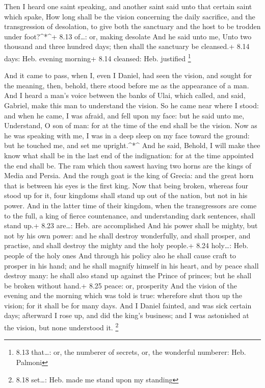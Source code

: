  Then I heard one saint speaking, and another saint said
unto that certain saint which spake, How long shall be the vision
concerning the daily sacrifice, and the transgression of desolation, to
give both the sanctuary and the host to be trodden under foot?\^{}*\^{}+
8.13 of\ldots: or, making desolate  And he said unto me,
Unto two thousand and three hundred days; then shall the sanctuary be
cleansed.+ 8.14 days: Heb. evening morning+ 8.14 cleansed: Heb.
justified \footnote{8.13 that\ldots: or, the numberer of secrets, or,
  the wonderful numberer: Heb. Palmoni}

 And it came to pass, when I, even I Daniel, had seen the
vision, and sought for the meaning, then, behold, there stood before me
as the appearance of a man.  And I heard a man's voice
between the banks of Ulai, which called, and said, Gabriel, make this
man to understand the vision.  So he came near where I
stood: and when he came, I was afraid, and fell upon my face: but he
said unto me, Understand, O son of man: for at the time of the end shall
be the vision.  Now as he was speaking with me, I was in a
deep sleep on my face toward the ground: but he touched me, and set me
upright.\^{}*\^{}  And he said, Behold, I will make thee
know what shall be in the last end of the indignation: for at the time
appointed the end shall be.  The ram which thou sawest
having two horns are the kings of Media and Persia.  And
the rough goat is the king of Grecia: and the great horn that is between
his eyes is the first king.  Now that being broken, whereas
four stood up for it, four kingdoms shall stand up out of the nation,
but not in his power.  And in the latter time of their
kingdom, when the transgressors are come to the full, a king of fierce
countenance, and understanding dark sentences, shall stand up.+ 8.23
are\ldots: Heb. are accomplished  And his power shall be
mighty, but not by his own power: and he shall destroy wonderfully, and
shall prosper, and practise, and shall destroy the mighty and the holy
people.+ 8.24 holy\ldots: Heb. people of the holy ones  And
through his policy also he shall cause craft to prosper in his hand; and
he shall magnify himself in his heart, and by peace shall destroy many:
he shall also stand up against the Prince of princes; but he shall be
broken without hand.+ 8.25 peace: or, prosperity  And the
vision of the evening and the morning which was told is true: wherefore
shut thou up the vision; for it shall be for many days. 
And I Daniel fainted, and was sick certain days; afterward I rose up,
and did the king's business; and I was astonished at the vision, but
none understood it. \footnote{8.18 set\ldots: Heb. made me stand upon my
  standing}

